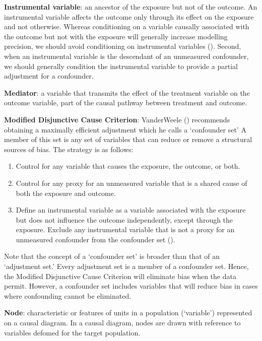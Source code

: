 \documentclass[
  singlecolumn]{article}
\providecommand{\tightlist}{%
  \setlength{\itemsep}{0pt}\setlength{\parskip}{0pt}}\usepackage{longtable,booktabs,array}
\begin{document}
\textbf{Instrumental variable}: an ancestor of the exposure but not of
the outcome. An instrumental variable affects the outcome only through
its effect on the exposure and not otherwise. Whereas conditioning on a
variable causally associated with the outcome but not with the exposure
will generally increase modelling precision, we should avoid
conditioning on instrumental variables
(). Second, when
an instrumental variable is the descendant of an unmeasured confounder,
we should generally condition the instrumental variable to provide a
partial adjustment for a confounder.

\textbf{Mediator}: a variable that transmits the effect of the treatment
variable on the outcome variable, part of the causal pathway between
treatment and outcome.

\textbf{Modified Disjunctive Cause Criterion}: VanderWeele
() recommends obtaining a maximally
efficient adjustment which he calls a `confounder set' A member of this
set is any set of variables that can reduce or remove a structural
sources of bias. The strategy is as follows:

\begin{enumerate}
\def\labelenumi{\alph{enumi}.}
\tightlist
\item
  Control for any variable that causes the exposure, the outcome, or
  both.
\item
  Control for any proxy for an unmeasured variable that is a shared
  cause of both the exposure and outcome.
\item
  Define an instrumental variable as a variable associated with the
  exposure but does not influence the outcome independently, except
  through the exposure. Exclude any instrumental variable that is not a
  proxy for an unmeasured confounder from the confounder set
  ().
\end{enumerate}

Note that the concept of a `confounder set' is broader than that of an
`adjustment set.' Every adjustment set is a member of a confounder set.
Hence, the Modified Disjunctive Cause Criterion will eliminate bias when
the data permit. However, a confounder set includes variables that will
reduce bias in cases where confounding cannot be eliminated.

\textbf{Node}: characteristic or features of units in a population
(`variable') represented on a causal diagram. In a causal diagram, nodes
are drawn with reference to variables defomed for the target population.
\end{document}
